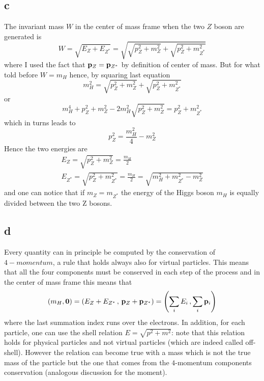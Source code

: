 \subsection*{c}
The invariant mass $W$ in the center of mass frame when the two $Z$ boson are generated is
\begin{equation*}
    W = \sqrt{E_Z + E_{Z^*}} = \sqrt{ \sqrt{p_Z^2 + m_Z^2} + \sqrt{p_Z^2 + m_{Z^*}^2}}
\end{equation*}
where I used the fact that $\mathbf{p}_Z = \mathbf{p}_{Z^*}$ by definition of center of mass. But for what told before $W=m_H$ hence, by squaring last equation 
\begin{equation*}
    m_H^2 = \sqrt{p_Z^2 + m_Z^2} + \sqrt{p_Z^2 + m_{Z^*}^2}
\end{equation*}
or
\begin{equation*}
    m_H^4 + p_Z^2 + m_Z^2 - 2m_H^2\sqrt{p_Z^2 + m_Z^2} = p_Z^2 + m_{Z^*}^2
\end{equation*}
which in turns leads to
\begin{equation*}
    p_Z^2 = \frac{m_H^2}{4} - m_Z^2
\end{equation*}
Hence the two energies are
\begin{gather*}
    E_Z = \sqrt{p_Z^2 + m_Z^2} = \frac{m_H}{2} \\
    E_{Z^*} = \sqrt{p_Z^2 + m_{Z^*}^2} = \frac{m_H}{2} = \sqrt{m_H^2 + m_{Z^*}^2 - m_Z^2}
\end{gather*}
and one can notice that if $m_Z = m_{Z^*}$ the energy of the Higgs boson $m_H$ is equally divided between the two Z bosons.

\subsection*{d}
Every quantity can in principle be computed by the conservation of $4-momentum$, a rule that holds always also for virtual particles. This means that 
all the four components must be conserved in each step of the process and in the center of mass frame this means that
\begin{equation*}
    (m_H, \mathbf{0}) = (E_Z + E_{Z^*} \, , \, \mathbf{p}_Z + \mathbf{p}_{Z^*}) = \left(\sum_i E_i \, , \sum_i \mathbf{p}_i \right)
\end{equation*}
where the last summation index runs over the electrons. In addition, for each particle, one can use the shell relation $E = \sqrt{p^2 + m^2}$:
note that this relation holds for physical particles and not virtual particles (which are indeed called off-shell). However the relation can become 
true with a mass which is not the true mass of the particle but the one that comes from the $4$-momentum components conservation (analogous discussion for the moment).
